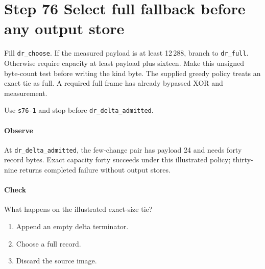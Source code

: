 \section{Step 76 Select full fallback before any output store}
Fill \texttt{dr\_choose}. If the measured payload is at least 12\,288, branch to \texttt{dr\_full}. Otherwise require capacity at least payload plus sixteen. Make this unsigned byte-count test before writing the kind byte. The supplied greedy policy treats an exact tie as full. A required full frame has already bypassed XOR and measurement.

Use \texttt{s76-1} and stop before \texttt{dr\_delta\_admitted}.

\paragraph{Observe} At \texttt{dr\_delta\_admitted}, the few-change pair has payload 24 and needs forty record bytes. Exact capacity forty succeeds under this illustrated policy; thirty-nine returns completed failure without output stores.

\paragraph{Check} What happens on the illustrated exact-size tie?
\begin{enumerate}[label=\Alph*.]
\item Append an empty delta terminator.
\item Choose a full record.
\item Discard the source image.
\end{enumerate}
